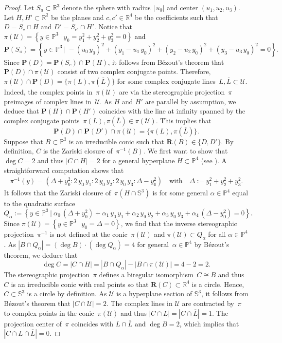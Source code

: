 \documentclass[11pt]{article}
\newcommand{\R}{\mathbb{R}}
\renewcommand{\P}{\mathbb{P}}
\renewcommand{\S}{\mathbb{S}}
\newcommand{\bP}{\mathbf{P}}
\newcommand{\bR}{\mathbf{R}}
\newcommand{\cU}{\mathcal{U}}
\newcommand{\oL}{{\overline{L}}}
\newcommand{\set}[2]{\left\{#1 ~|~ #2\right\}}
\newcommand{\st}{such that }
\begin{document}
\begin{proof}
Let $S_u\subset\R^3$ denote the sphere with radius~$|u_0|$ and center $(u_1,u_2,u_3)$.
Let $H,H'\subset\R^3$ be the planes and $c,c'\in\R^4$ be the coefficients
\st $D=S_c\cap H$ and $D'=S_{c'}\cap H'$.
Notice that $\pi(\cU)=\set{y\in\P^3}{y_0=y_1^2+y_2^2+y_3^2=0}$ and
\[
\bP(S_u)=\set{y\in\P^3}{-(u_0\,y_0)^2+(y_1-u_1\,y_0)^2+(y_2-u_2\,y_0)^2+(y_3-u_3\,y_0)^2=0}.
\]
Since $\bP(D)=\bP(S_c)\cap\bP(H)$,
it follows from B\'ezout's theorem that~$\bP(D)\cap\pi(\cU)$ consist
of two complex conjugate points.
Therefore, $\pi(\cU)\cap\bP(D)=\{\pi(L),\pi(\oL)\}$
for some complex conjugate lines~$L,\oL\subset\cU$.
Indeed, the complex points in~$\pi(\cU)$ are via the stereographic projection~$\pi$ preimages of complex lines in~$\cU$.
As $H$ and $H'$ are parallel by assumption, we deduce that $\bP(H)\cap\bP(H')$
coincides with the line at infinity spanned by the complex conjugate points~$\pi(L),\pi(\oL)\in\pi(\cU)$.
This implies that
\[
\bP(D)\cap\bP(D')\cap\pi(\cU)=\{\pi(L),\pi(\oL)\}.
\]
Suppose that $B\subset\P^3$ is an irreducible conic
\st $\bR(B)\in\{D,D'\}$.
By definition, $C$ is the Zariski closure of~$\pi^{-1}(B)$.
We first want to show that $\deg C=2$
and thus $|C\cap H|=2$
for a general hyperplane $H\subset \P^4$ (see \citep[\textsection I.7]{1977}).
A straightforward computation shows that
\begin{gather*}
\pi^{-1}(y)=
(
\Delta+y_0^2:
2\,y_0\,y_1:
2\,y_0\,y_2:
2\,y_0\,y_3:
\Delta-y_0^2
)
\quad\text{with}\quad
\Delta:=y_1^2+y_2^2+y_3^2.
\end{gather*}
It follows that the Zariski closure of~$\pi(H\cap\S^3)$
is for some general $\alpha\in\P^4$ equal to the quadratic surface
\[
Q_\alpha:=\set{y\in \P^3}{
\alpha_0\,(\Delta+y_0^2)+
\alpha_1\,y_0\,y_1+
\alpha_2\,y_0\,y_2+
\alpha_3\,y_0\,y_3+
\alpha_4\,(\Delta-y_0^2)=0}.
\]
Since $\pi(\cU)=\set{y\in\P^3}{y_0=\Delta=0}$, we find that
the inverse stereographic projection~$\pi^{-1}$ is not defined at
the conic~$\pi(\cU)$
and $\pi(\cU)\subset Q_\alpha$ for all $\alpha\in \P^4$.
As $|B\cap Q_\alpha|=(\deg B)\cdot(\deg Q_\alpha) =4$
for general~$\alpha\in\P^4$ by B\'ezout's theorem, we deduce that
\[
\deg C=|C\cap H|=|B\cap Q_\alpha|-|B\cap \pi(\cU)|=4-2=2.
\]
The stereographic projection~$\pi$ defines a biregular isomorphism~$C\cong B$ and
thus $C$ is an irreducible conic with real points so that $\bR(C)\subset \R^4$ is a circle.
Hence, $C\subset\S^3$ is a circle by definition.
As $\cU$ is a hyperplane section of $\S^3$,
it follows from B\'ezout's theorem that $|C\cap\cU|=2$.
The complex lines in $\cU$ are contracted by~$\pi$ to complex points in
the conic~$\pi(\cU)$ and thus $|C\cap L|=|C\cap\oL|=1$.
The projection center of~$\pi$ coincides with $L\cap\oL$ and $\deg B=2$,
which implies that $|C\cap L\cap\oL|=0$.
\end{proof}
\end{document}
